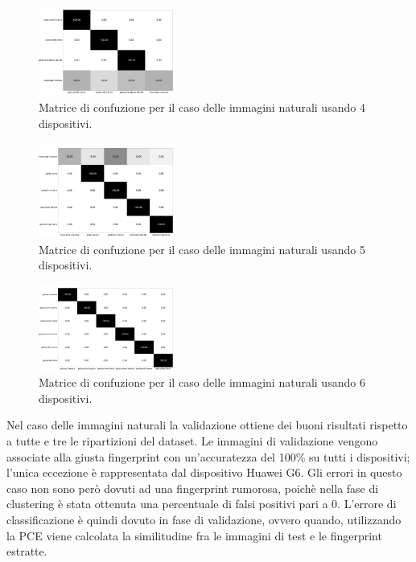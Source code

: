 \begin{figure}[h]
\begin{center}
\includegraphics[width=0.4\textwidth]{images/confusionmatrix_nat_4.png}
\end{center}
  \caption{Matrice di confuzione per il caso delle immagini naturali usando 4 dispositivi.}
\label{fig:validation}
\end{figure}

\begin{figure}[h]
\begin{center}
\includegraphics[width=0.4\textwidth]{images/confusionmatrix_nat_5.png}
\end{center}
  \caption{Matrice di confuzione per il caso delle immagini naturali usando 5 dispositivi.}
\label{fig:validation}
\end{figure}

\begin{figure}[h]
\begin{center}
\includegraphics[width=0.4\textwidth]{images/confusionmatrix_nat_6.png}
\end{center}
  \caption{Matrice di confuzione per il caso delle immagini naturali usando 6 dispositivi.}
\label{fig:validation}
\end{figure}

Nel caso delle immagini naturali la validazione ottiene dei buoni risultati rispetto a tutte e tre le ripartizioni del dataset. Le immagini di validazione vengono associate alla giusta fingerprint con un'accuratezza del 100\% su tutti i dispositivi; l'unica eccezione è rappresentata dal dispositivo Huawei G6. Gli errori in questo caso non sono però dovuti ad una fingerprint rumorosa, poichè nella fase di clustering è stata ottenuta una percentuale di falsi positivi pari a 0. L'errore di classificazione è quindi dovuto in fase di validazione, ovvero quando, utilizzando la PCE viene calcolata la similitudine fra le immagini di test e le fingerprint estratte.

